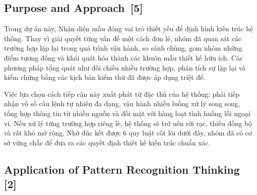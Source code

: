 \documentclass[12pt, a4paper]{article}
\begin{document}

\subsection[Purpose and Approach]{Purpose and Approach \,{\normalfont\small\textcolor{cyan!70!black}{[5]}}}
Trong dự án này, Nhận diện mẫu đóng vai trò thiết yếu để định hình kiến trúc hệ thống. Thay vì giải quyết từng vấn đề một cách đơn lẻ, nhóm đã quan sát các trường hợp lặp lại trong quá trình vận hành, so sánh chúng, gom nhóm những điểm tương đồng và khái quát hóa thành các khuôn mẫu thiết kế hữu ích. Các phương pháp tổng quát như đối chiếu nhiều trường hợp, phân tích sự lặp lại và kiểm chứng bằng các kịch bản kiểm thử đã được áp dụng triệt để.

\noindent Việc lựa chọn cách tiếp cận này xuất phát từ đặc thù của hệ thống: phải tiếp nhận vô số câu lệnh tự nhiên đa dạng, vận hành nhiều luồng xử lý song song, tổng hợp thông tin từ nhiều nguồn và đối mặt với hàng loạt tình huống lỗi ngoại vi. Nếu xử lý từng trường hợp riêng lẻ, hệ thống sẽ trở nên rời rạc, thiếu đồng bộ và rất khó mở rộng. Nhờ đúc kết được 6 quy luật cốt lõi dưới đây, nhóm đã có cơ sở vững chắc để đưa ra các quyết định thiết kế kiến trúc chuẩn xác.

\subsection[Application of Pattern Recognition Thinking]{Application of Pattern Recognition Thinking \,{\normalfont\small\textcolor{cyan!70!black}{[2]}}}
\end{document}
